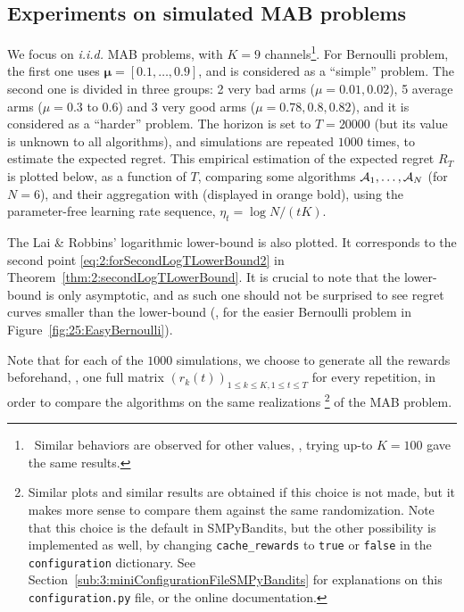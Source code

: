 \subsection{Experiments on simulated MAB problems}\label{sub:25:numExp}





We focus on \emph{i.i.d.} MAB problems, with $K = 9$ channels\footnote{~Similar behaviors are observed for other values, \eg, trying up-to $K = 100$ gave the same results.}.
For Bernoulli problem, the first one uses $\boldsymbol{\mu}=[0.1,\dots,0.9]$, and is considered as a ``simple'' problem.
The second one is divided in three groups:
2 very bad arms ($\mu = 0.01, 0.02$), 5 average arms ($\mu = 0.3$ to $0.6$) and 3 very good arms ($\mu = 0.78, 0.8, 0.82$), and it is considered as a ``harder'' problem.
The horizon is set to $T = 20000$ (but its value is unknown to all algorithms), and simulations are repeated $1000$ times, to estimate the expected regret.
%
This empirical estimation of the expected regret $R_T$ is plotted below, as a function of $T$, comparing some algorithms $\mathcal{A}_1,\dots,\mathcal{A}_N$ (for $N=6$), and their aggregation with \Aggr{} (displayed in orange bold),
using the parameter-free learning rate sequence, $\eta_t = \log{N} / (t K)$.

The Lai \& Robbins' logarithmic lower-bound \cite{LaiRobbins85} is also plotted.
It corresponds to the second point \eqref{eq:2:forSecondLogTLowerBound2} in Theorem~\ref{thm:2:secondLogTLowerBound}.
It is crucial to note that the lower-bound is only asymptotic, and as such one should not be surprised to see regret curves smaller than the lower-bound (\eg, for the easier Bernoulli problem in Figure~\ref{fig:25:EasyBernoulli}).

Note that for each of the $1000$ simulations, we choose to generate all the rewards beforehand, \ie, one full matrix $(r_k(t))_{1\leq k \leq K, 1 \leq t \leq T}$ for every repetition, in order to compare the algorithms on the same realizations%
\footnote{Similar plots and similar results are obtained if this choice is not made, but it makes more sense to compare them against the same randomization. Note that this choice is the default in SMPyBandits, but the other possibility is implemented as well, by changing \texttt{cache\_rewards} to \texttt{true} or \texttt{false} in the \texttt{configuration} dictionary. See Section~\ref{sub:3:miniConfigurationFileSMPyBandits} for explanations on this \texttt{configuration.py} file, or the online documentation.}
of the MAB problem.

